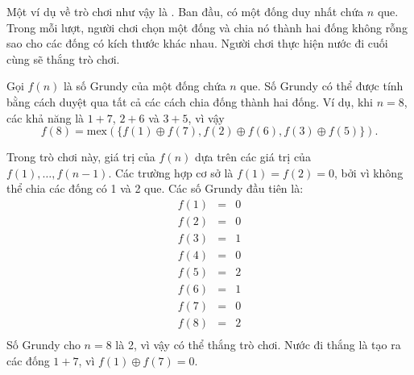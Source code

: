 
Một ví dụ về trò chơi như vậy là .
Ban đầu, có một đống duy nhất chứa $n$ que.
Trong mỗi lượt, người chơi chọn một đống và chia
nó thành hai đống không rỗng sao cho các đống
có kích thước khác nhau.
Người chơi thực hiện nước đi cuối cùng sẽ thắng trò chơi.

Gọi $f(n)$ là số Grundy của một đống
chứa $n$ que.
Số Grundy có thể được tính bằng cách duyệt
qua tất cả các cách chia đống thành
hai đống.
Ví dụ, khi $n=8$, các khả năng
là $1+7$, $2+6$ và $3+5$, vì vậy
\[f(8)=\textrm{mex}(\{f(1) \oplus f(7), f(2) \oplus f(6), f(3) \oplus f(5)\}).\]

Trong trò chơi này, giá trị của $f(n)$ dựa trên các giá trị
của $f(1),\ldots,f(n-1)$.
Các trường hợp cơ sở là $f(1)=f(2)=0$,
bởi vì không thể chia các đống
có 1 và 2 que.
Các số Grundy đầu tiên là:
\[
\begin{array}{lcl}
f(1) & = & 0 \\
f(2) & = & 0 \\
f(3) & = & 1 \\
f(4) & = & 0 \\
f(5) & = & 2 \\
f(6) & = & 1 \\
f(7) & = & 0 \\
f(8) & = & 2 \\
\end{array}
\]
Số Grundy cho $n=8$ là 2,
vì vậy có thể thắng trò chơi.
Nước đi thắng là tạo ra các đống
$1+7$, vì $f(1) \oplus f(7) = 0$.